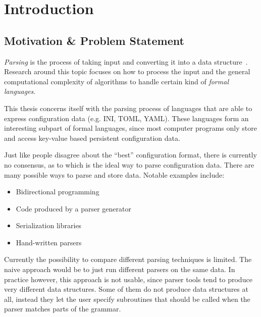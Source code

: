 \chapter{Introduction}

\section{Motivation \& Problem Statement}
\label{sec:Motivation}

\begin{sloppypar}
\emph{Parsing} is the process of taking input and converting it into a data structure~\cite{wikipedia2016Parser, grune2007parsing}. Research around this topic focuses on how to process the input and the general computational complexity of algorithms to handle certain kind of \emph{formal languages}.
\end{sloppypar}

This thesis concerns itself with the parsing process of languages that are able to express configuration data (e.g. INI, TOML, YAML). These languages form an interesting subpart of formal languages, since most computer programs only store and access key-value based persistent configuration data.

Just like people disagree about the “best” configuration format, there is currently no consensus, as to which is the ideal way to parse configuration data. There are many possible ways to parse and store data. Notable examples include:

\begin{itemize}
  \item Bidirectional programming~\cite{foster2005combinators, bohannon2006relational, lutterkort2008augeas, ko2016bigul, raab2016improving}
  \item Code produced by a parser generator~\cite{denny2008ielr, parr2014adaptive, warth2016modular, bates2017aprt}
  \item Serialization libraries~\cite{sumaray2012cds, pacini2015performance}
  \item Hand-written parsers~\cite{myers2008cparser, bendersky2012clang}
\end{itemize}

Currently the possibility to compare different parsing techniques is limited. The naive approach would be to just run different parsers on the same data. In practice however, this approach is not usable, since parser tools tend to produce very different data structures. Some of them do not produce data structures at all, instead they let the user specify subroutines that should be called when the parser matches parts of the grammar.

